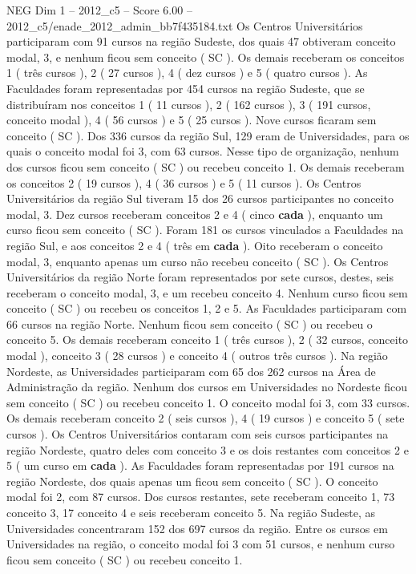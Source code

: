 \begin{textsample}{NEG Dim 1 – 2012\_c5 – Score 6.00 – 2012\_c5/enade\_2012\_admin\_bb7f435184.txt}
Os Centros Universitários participaram com 91 cursos na região Sudeste, dos quais 47 obtiveram conceito modal, 3, e nenhum ficou sem conceito ( SC ).
Os demais receberam os conceitos 1 ( três cursos ), 2 ( 27 cursos ), 4 ( dez cursos ) e 5 ( quatro cursos ).
As Faculdades foram representadas por 454 cursos na região Sudeste, que se distribuíram nos conceitos 1 ( 11 cursos ), 2 ( 162 cursos ), 3 ( 191 cursos, conceito modal ), 4 ( 56 cursos ) e 5 ( 25 cursos ).
Nove cursos ficaram sem conceito ( SC ).
Dos 336 cursos da região Sul, 129 eram de Universidades, para os quais o conceito modal foi 3, com 63 cursos.
Nesse tipo de organização, nenhum dos cursos ficou sem conceito ( SC ) ou recebeu conceito 1.
Os demais receberam os conceitos 2 ( 19 cursos ), 4 ( 36 cursos ) e 5 ( 11 cursos ).
Os Centros Universitários da região Sul tiveram 15 dos 26 cursos participantes no conceito modal, 3.
Dez cursos receberam conceitos 2 e 4 ( cinco \textbf{cada} ), enquanto um curso ficou sem conceito ( SC ).
Foram 181 os cursos vinculados a Faculdades na região Sul, e aos conceitos 2 e 4 ( três em \textbf{cada} ).
Oito receberam o conceito modal, 3, enquanto apenas um curso não recebeu conceito ( SC ).
Os Centros Universitários da região Norte foram representados por sete cursos, destes, seis receberam o conceito modal, 3, e um recebeu conceito 4.
Nenhum curso ficou sem conceito ( SC ) ou recebeu os conceitos 1, 2 e 5.
As Faculdades participaram com 66 cursos na região Norte.
Nenhum ficou sem conceito ( SC ) ou recebeu o conceito 5.
Os demais receberam conceito 1 ( três cursos ), 2 ( 32 cursos, conceito modal ), conceito 3 ( 28 cursos ) e conceito 4 ( outros três cursos ).
Na região Nordeste, as Universidades participaram com 65 dos 262 cursos na Área de Administração da região.
Nenhum dos cursos em Universidades no Nordeste ficou sem conceito ( SC ) ou recebeu conceito 1.
O conceito modal foi 3, com 33 cursos.
Os demais receberam conceito 2 ( seis cursos ), 4 ( 19 cursos ) e conceito 5 ( sete cursos ).
Os Centros Universitários contaram com seis cursos participantes na região Nordeste, quatro deles com conceito 3 e os dois restantes com conceitos 2 e 5 ( um curso em \textbf{cada} ).
As Faculdades foram representadas por 191 cursos na região Nordeste, dos quais apenas um ficou sem conceito ( SC ).
O conceito modal foi 2, com 87 cursos.
Dos cursos restantes, sete receberam conceito 1, 73 conceito 3, 17 conceito 4 e seis receberam conceito 5.
Na região Sudeste, as Universidades concentraram 152 dos 697 cursos da região.
Entre os cursos em Universidades na região, o conceito modal foi 3 com 51 cursos, e nenhum curso ficou sem conceito ( SC ) ou recebeu conceito 1.

\end{textsample}
